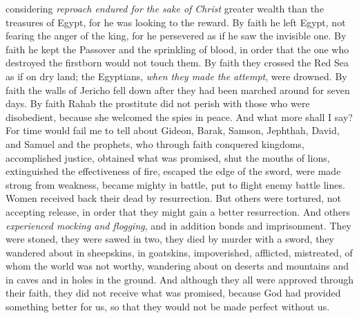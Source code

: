 \begin{biblechapter}
\verse considering \textit{reproach endured for the sake of Christ} greater wealth than the treasures of Egypt, for he was looking to the reward.
\verse By faith he left Egypt, not fearing the anger of the king, for he persevered as if he saw the invisible one.
\verse By faith he kept the Passover and the sprinkling of blood, in order that the one who destroyed the firstborn would not touch them.
\verse By faith they crossed the Red Sea as if on dry land; the Egyptians, \textit{when they made the attempt}, were drowned.
\verse By faith the walls of Jericho fell down after they had been marched around for seven days.
\verse By faith Rahab the prostitute did not perish with those who were disobedient, because she welcomed the spies in peace.
\verse And what more shall I say? For time would fail me to tell about Gideon, Barak, Samson, Jephthah, David, and Samuel and the prophets,
\verse who through faith conquered kingdoms, accomplished justice, obtained what was promised, shut the mouths of lions,
\verse extinguished the effectiveness of fire, escaped the edge of the sword, were made strong from weakness, became mighty in battle, put to flight enemy battle lines.
\verse Women received back their dead by resurrection. But others were tortured, not accepting release, in order that they might gain a better resurrection.
\verse And others \textit{experienced mocking and flogging}, and in addition bonds and imprisonment.
\verse They were stoned, they were sawed in two, they died by murder with a sword, they wandered about in sheepskins, in goatskins, impoverished, afflicted, mistreated,
\verse of whom the world was not worthy, wandering about on deserts and mountains and in caves and in holes in the ground.
\verse And although they all were approved through their faith, they did not receive what was promised,
\verse because God had provided something better for us, so that they would not be made perfect without us.
\end{biblechapter}

